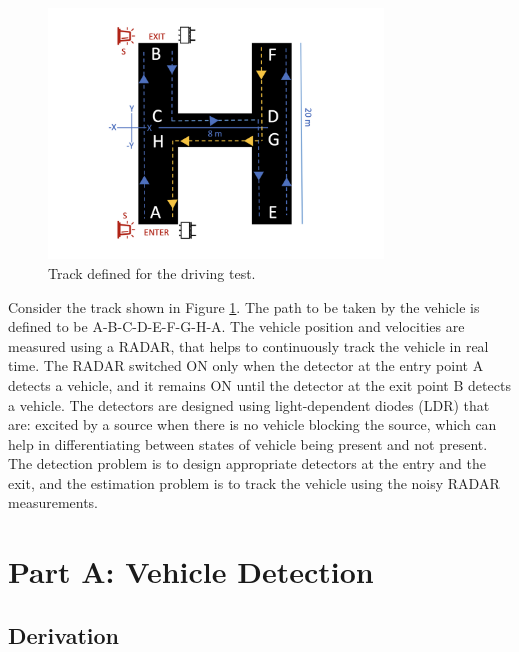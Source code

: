 \documentclass[11pt]{article}
\begin{document}
\begin{figure}[h!]
	\centering
	\includegraphics[width=3.5in]{../results/path.png}
\caption{Track defined for the driving test.}
\label{fig:path}
\end{figure}
Consider the track shown in Figure \ref{fig:path}. The path to be taken by the vehicle is defined to be A-B-C-D-E-F-G-H-A. The vehicle position and velocities are measured using a RADAR, that helps to continuously track the vehicle in real time. The RADAR switched ON only when the detector at the entry point A detects a vehicle, and it remains ON until the detector at the exit point B detects a vehicle. The detectors are designed using light-dependent diodes (LDR) that are: excited by a source when there is no vehicle blocking the source, which can help in differentiating between states of vehicle being present and not present. The detection problem is to design appropriate detectors at the entry and the exit, and the estimation problem is to track the vehicle using the noisy RADAR measurements.


\section{Part A: Vehicle Detection}
\label{sec:partA_Detection}

\subsection{Derivation}
\label{subsec:partA_derivation}
\end{document}
